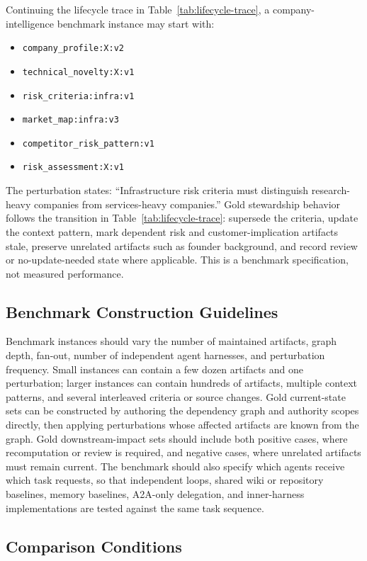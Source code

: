 \documentclass{article}
\begin{document}
Continuing the lifecycle trace in Table~\ref{tab:lifecycle-trace}, a company-intelligence benchmark instance may start with:
\begin{itemize}[leftmargin=*]
\item \texttt{company\_profile:X:v2}
\item \texttt{technical\_novelty:X:v1}
\item \texttt{risk\_criteria:infra:v1}
\item \texttt{market\_map:infra:v3}
\item \texttt{competitor\_risk\_pattern:v1}
\item \texttt{risk\_assessment:X:v1}
\end{itemize}

The perturbation states: ``Infrastructure risk criteria must distinguish research-heavy companies from services-heavy companies.'' Gold stewardship behavior follows the transition in Table~\ref{tab:lifecycle-trace}: supersede the criteria, update the context pattern, mark dependent risk and customer-implication artifacts stale, preserve unrelated artifacts such as founder background, and record review or no-update-needed state where applicable. This is a benchmark specification, not measured performance.

\subsection{Benchmark Construction Guidelines}

Benchmark instances should vary the number of maintained artifacts, graph depth, fan-out, number of independent agent harnesses, and perturbation frequency. Small instances can contain a few dozen artifacts and one perturbation; larger instances can contain hundreds of artifacts, multiple context patterns, and several interleaved criteria or source changes. Gold current-state sets can be constructed by authoring the dependency graph and authority scopes directly, then applying perturbations whose affected artifacts are known from the graph. Gold downstream-impact sets should include both positive cases, where recomputation or review is required, and negative cases, where unrelated artifacts must remain current. The benchmark should also specify which agents receive which task requests, so that independent loops, shared wiki or repository baselines, memory baselines, A2A-only delegation, and inner-harness implementations are tested against the same task sequence.

\subsection{Comparison Conditions}
\end{document}
